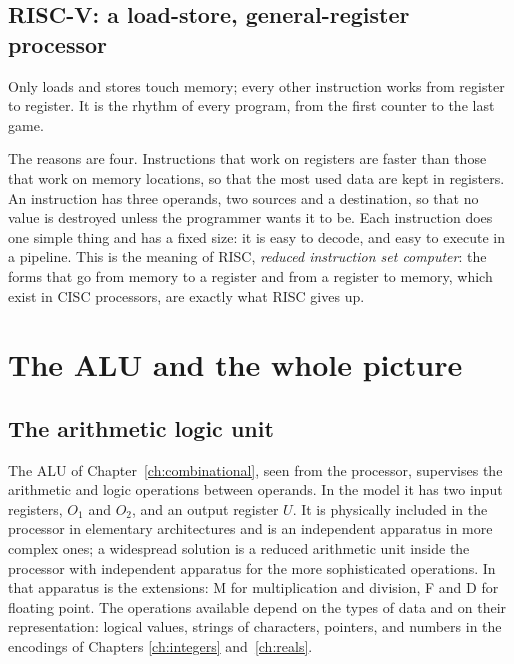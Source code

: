 \subsection{RISC-V: a load-store, general-register processor}

\begin{prgconcept}
Only loads and stores touch memory; every other instruction works from
register to register. It is the rhythm of every \riscv program, from the
first counter to the last game.
\end{prgconcept}

The reasons are four. Instructions that work on registers are faster than
those that work on memory locations, so that the most used data are kept in
registers. An instruction has three operands, two sources and a destination,
so that no value is destroyed unless the programmer wants it to be. Each
instruction does one simple thing and has a fixed size: it is easy to decode,
and easy to execute in a pipeline. This is the meaning of RISC, \emph{reduced
instruction set computer}: the forms that go from memory to a register and
from a register to memory, which exist in CISC processors, are exactly what
RISC gives up.

\section{The ALU and the whole picture}

\subsection{The arithmetic logic unit}

The ALU of Chapter~\ref{ch:combinational}, seen from the processor,
supervises the arithmetic and logic operations between operands. In the model
it has two input registers, $O_1$ and $O_2$, and an output register $U$. It
is physically included in the processor in elementary architectures and is an
independent apparatus in more complex ones; a widespread solution is a reduced
arithmetic unit inside the processor with independent apparatus for the more
sophisticated operations. In \riscv that apparatus is the extensions: M for
multiplication and division, F and D for floating point. The operations
available depend on the types of data and on their representation: logical
values, strings of characters, pointers, and numbers in the encodings of
Chapters \ref{ch:integers} and~\ref{ch:reals}.

